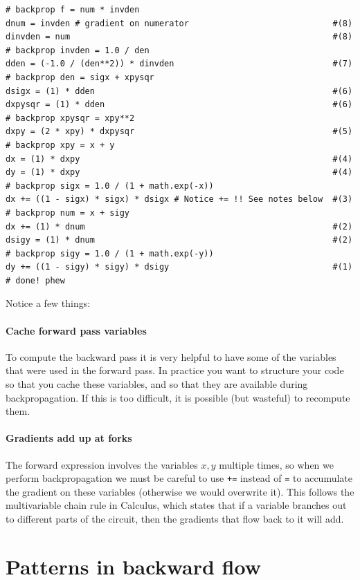 \begin{lstlisting}[frame=single]
# backprop f = num * invden
dnum = invden # gradient on numerator                             #(8)
dinvden = num                                                     #(8)
# backprop invden = 1.0 / den 
dden = (-1.0 / (den**2)) * dinvden                                #(7)
# backprop den = sigx + xpysqr
dsigx = (1) * dden                                                #(6)
dxpysqr = (1) * dden                                              #(6)
# backprop xpysqr = xpy**2
dxpy = (2 * xpy) * dxpysqr                                        #(5)
# backprop xpy = x + y
dx = (1) * dxpy                                                   #(4)
dy = (1) * dxpy                                                   #(4)
# backprop sigx = 1.0 / (1 + math.exp(-x))
dx += ((1 - sigx) * sigx) * dsigx # Notice += !! See notes below  #(3)
# backprop num = x + sigy
dx += (1) * dnum                                                  #(2)
dsigy = (1) * dnum                                                #(2)
# backprop sigy = 1.0 / (1 + math.exp(-y))
dy += ((1 - sigy) * sigy) * dsigy                                 #(1)
# done! phew
\end{lstlisting}

Notice a few things:

\paragraph*{Cache forward pass variables} To compute the backward pass it is very helpful to have some of the variables that were used in the forward pass. In practice you want to structure your code so that you cache these variables, and so that they are available during backpropagation. If this is too difficult, it is possible (but wasteful) to recompute them.

\paragraph*{Gradients add up at forks} The forward expression involves the variables $x,y$ multiple times, so when we perform backpropagation we must be careful to use \texttt{+=} instead of \texttt{=} to accumulate the gradient on these variables (otherwise we would overwrite it). This follows the multivariable chain rule in Calculus, which states that if a variable branches out to different parts of the circuit, then the gradients that flow back to it will add.


\section*{Patterns in backward flow}

